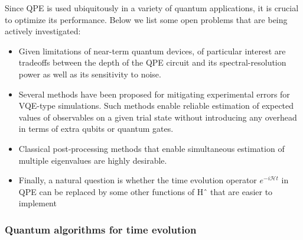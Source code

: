 \documentclass{book}
\theoremstyle{definition}
\newcommand{\had}{\mathcal{H}}
\begin{document}
Since QPE is used ubiquitously in a variety of quantum applications, it is crucial to optimize its performance. Below we
list some open problems that are being actively investigated:
\begin{itemize}
	\item Given limitations of near-term quantum devices, of particular interest are tradeoffs between the depth of the
	QPE circuit and its spectral-resolution power as well
	as its sensitivity to noise.
	
	\item Several methods have been proposed for mitigating experimental errors for VQE-type simulations. Such methods enable reliable estimation of expected values of observables on a given trial state without introducing any overhead in terms of extra qubits or quantum gates.
	
	
	\item Classical post-processing methods that enable simultaneous estimation of multiple eigenvalues are highly desirable.
	
	\item Finally, a natural question is whether the time evolution
	operator $e^{-i \had t}$
	in QPE can be replaced by some other
	functions of Hˆ that are easier to implement
\end{itemize}




\subsubsection{Quantum algorithms for time evolution}
\end{document}
